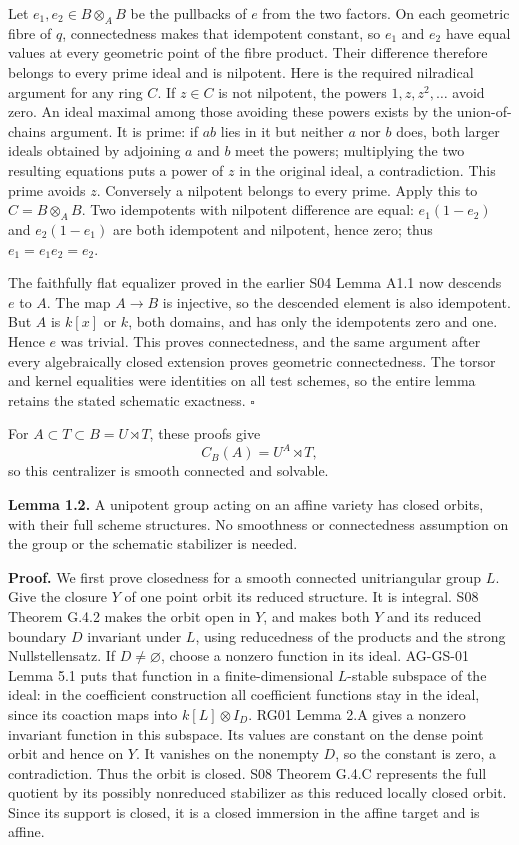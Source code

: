 \documentclass[11pt,a4paper,openany]{report}
\newcounter{none}
\begin{document}
Let \(e_1,e_2\in B\otimes_A B\) be the pullbacks of \(e\) from the two factors. On each geometric fibre of \(q\), connectedness makes that idempotent constant, so \(e_1\) and \(e_2\) have equal values at every geometric point of the fibre product. Their difference therefore belongs to every prime ideal and is nilpotent. Here is the required nilradical argument for any ring \(C\). If \(z\in C\) is not nilpotent, the powers \(1,z,z^2,\ldots\) avoid zero. An ideal maximal among those avoiding these powers exists by the union-of-chains argument. It is prime: if \(ab\) lies in it but neither \(a\) nor \(b\) does, both larger ideals obtained by adjoining \(a\) and \(b\) meet the powers; multiplying the two resulting equations puts a power of \(z\) in the original ideal, a contradiction. This prime avoids \(z\). Conversely a nilpotent belongs to every prime. Apply this to \(C=B\otimes_A B\). Two idempotents with nilpotent difference are equal: \(e_1(1-e_2)\) and \(e_2(1-e_1)\) are both idempotent and nilpotent, hence zero; thus \(e_1=e_1e_2=e_2\).

The faithfully flat equalizer proved in the earlier S04 Lemma A1.1 now descends \(e\) to \(A\). The map \(A\to B\) is injective, so the descended element is also idempotent. But \(A\) is \(k[x]\) or \(k\), both domains, and has only the idempotents zero and one. Hence \(e\) was trivial. This proves connectedness, and the same argument after every algebraically closed extension proves geometric connectedness. The torsor and kernel equalities were identities on all test schemes, so the entire lemma retains the stated schematic exactness. \(\square\)

For \(A\subset T\subset B=U\rtimes T\), these proofs give \[
C_B(A)=U^A\rtimes T,
\] so this centralizer is smooth connected and solvable.

\textbf{Lemma 1.2.} A unipotent group acting on an affine variety has closed orbits, with their full scheme structures. No smoothness or connectedness assumption on the group or the schematic stabilizer is needed.

\textbf{Proof.} We first prove closedness for a smooth connected unitriangular group \(L\). Give the closure \(Y\) of one point orbit its reduced structure. It is integral. S08 Theorem G.4.2 makes the orbit open in \(Y\), and makes both \(Y\) and its reduced boundary \(D\) invariant under \(L\), using reducedness of the products and the strong Nullstellensatz. If \(D\ne\varnothing\), choose a nonzero function in its ideal. AG-GS-01 Lemma 5.1 puts that function in a finite-dimensional \(L\)-stable subspace of the ideal: in the coefficient construction all coefficient functions stay in the ideal, since its coaction maps into \(k[L]\otimes I_D\). RG01 Lemma 2.A gives a nonzero invariant function in this subspace. Its values are constant on the dense point orbit and hence on \(Y\). It vanishes on the nonempty \(D\), so the constant is zero, a contradiction. Thus the orbit is closed. S08 Theorem G.4.C represents the full quotient by its possibly nonreduced stabilizer as this reduced locally closed orbit. Since its support is closed, it is a closed immersion in the affine target and is affine.
\end{document}
